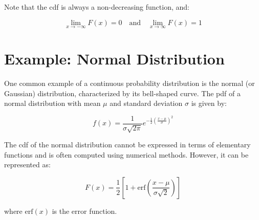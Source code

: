 Note that the cdf is always a non-decreasing function, and:

\begin{equation}
\lim_{x\to-\infty} F(x) = 0 \quad \text{and} \quad \lim_{x\to\infty} F(x) = 1
\end{equation}

\section{Example: Normal Distribution}

One common example of a continuous probability distribution is the normal (or Gaussian) distribution, characterized by its bell-shaped curve. The pdf of a normal distribution with mean $\mu$ and standard deviation $\sigma$ is given by:

\begin{equation}
f(x) = \frac{1}{\sigma\sqrt{2\pi}} e^{ -\frac{1}{2} \left(\frac{x-\mu}{\sigma}\right)^2 }
\end{equation}

The cdf of the normal distribution cannot be expressed in terms of elementary functions and is often computed using numerical methods. However, it can be represented as:

\begin{equation}
F(x) = \frac{1}{2}[1 + \text{erf}(\frac{x - \mu}{\sigma\sqrt{2}})]
\end{equation}

where $\text{erf}(x)$ is the error function.

\